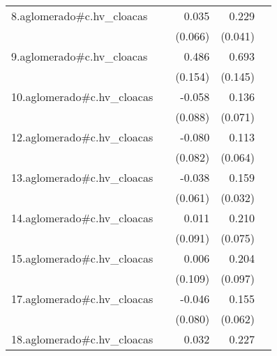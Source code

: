 {\begin{longtable}{l*{4}{D{.}{.}{-1}}}
\addlinespace
8.aglomerado#c.hv\_cloacas&                     &       0.035         &       0.229\sym{***}&                     \\
            &                     &     (0.066)         &     (0.041)         &                     \\
\addlinespace
9.aglomerado#c.hv\_cloacas&                     &       0.486\sym{**} &       0.693\sym{***}&                     \\
            &                     &     (0.154)         &     (0.145)         &                     \\
\addlinespace
10.aglomerado#c.hv\_cloacas&                     &      -0.058         &       0.136         &                     \\
            &                     &     (0.088)         &     (0.071)         &                     \\
\addlinespace
12.aglomerado#c.hv\_cloacas&                     &      -0.080         &       0.113         &                     \\
            &                     &     (0.082)         &     (0.064)         &                     \\
\addlinespace
13.aglomerado#c.hv\_cloacas&                     &      -0.038         &       0.159\sym{***}&                     \\
            &                     &     (0.061)         &     (0.032)         &                     \\
\addlinespace
14.aglomerado#c.hv\_cloacas&                     &       0.011         &       0.210\sym{**} &                     \\
            &                     &     (0.091)         &     (0.075)         &                     \\
\addlinespace
15.aglomerado#c.hv\_cloacas&                     &       0.006         &       0.204\sym{*}  &                     \\
            &                     &     (0.109)         &     (0.097)         &                     \\
\addlinespace
17.aglomerado#c.hv\_cloacas&                     &      -0.046         &       0.155\sym{*}  &                     \\
            &                     &     (0.080)         &     (0.062)         &                     \\
\addlinespace
18.aglomerado#c.hv\_cloacas&                     &       0.032         &       0.227\sym{***}&                     \\

\end{longtable}}
